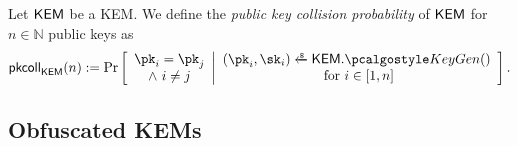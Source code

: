 \begin{definition}
    \label{def:pk-collisions}
    Let $\textsf{KEM}$ be a KEM.
    We define the \emph{public key collision probability} of $\textsf{KEM}$ for $n \in \mathbb{N}$ public keys as
    \[
        \pkcoll{\KEM}(n) := \Pr\left[
            \begin{array}{c}
                \pk_i = \pk_j \\
                \land~ i \neq j
            \end{array}
            \middle|
            \begin{array}{c}
                (\pk_i,\sk_i) \getsr \KEM.\kgen() \\
                \text{ for } i \in [1,n]
            \end{array}
            \right].
    \]
\end{definition}

\subsection{Obfuscated KEMs}

